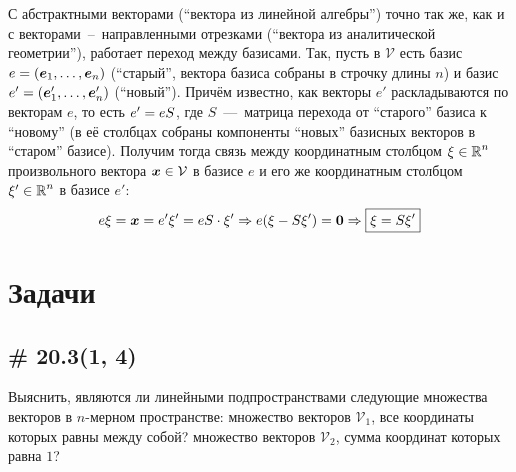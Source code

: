 \documentclass[a4paper,12pt]{article}
\begin{document}
  С абстрактными векторами (``вектора из линейной алгебры'') точно так же, как и с векторами~--~направленными отрезками (``вектора из аналитической геометрии''), работает переход между базисами.
  Так, пусть в $\mathcal V$ есть базис $e \hm= (\bds e_1, \ldots, \bds e_n)$ (``старый'', вектора базиса собраны в строчку длины $n$) и базис $e' \hm= (\bds e_1', \ldots, \bds e_n')$ (``новый'').
  Причём известно, как векторы $e'$ раскладываются по векторам $e$, то есть $e' \hm= e S$, где $S$~---~матрица перехода от ``старого'' базиса к ``новому'' (в её столбцах собраны компоненты ``новых'' базисных векторов в ``старом'' базисе).
  Получим тогда связь между координатным столбцом $\xi \hm\in \RR^n$ произвольного вектора $\bds x \hm\in \mathcal V$ в базисе $e$ и его же координатным столбцом $\xi' \hm\in \RR^n$ в базисе $e'$:
  \[
    e \xi = \boldsymbol x = e' \xi' = eS \cdot \xi' \Rightarrow e (\xi - S \xi') = \boldsymbol 0 \Rightarrow \boxed{\xi = S \xi'}
  \]
  
  

  \section{Задачи}
  
  
  \subsection{\# 20.3(1, 4)}
  
  Выяснить, являются ли линейными подпространствами следующие множества векторов в $n$-мерном пространстве:
  множество векторов $\mathcal V_1$, все координаты которых равны между собой?
  множество векторов $\mathcal V_2$, сумма координат которых равна $1$?
  
\end{document}
